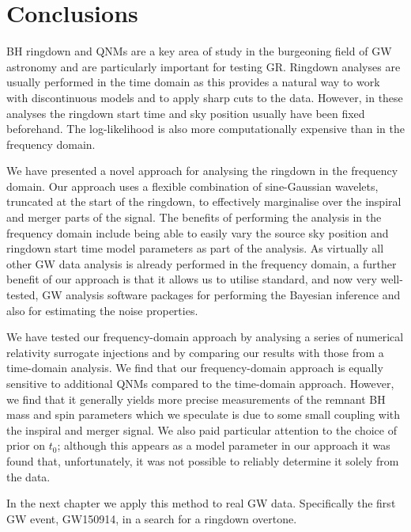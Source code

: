 \section{Conclusions}\label{ch3:sec:discussion}

BH ringdown and QNMs are a key area of study in the burgeoning field of GW astronomy and are particularly important for testing GR.
Ringdown analyses are usually performed in the time domain as this provides a natural way to work with discontinuous models and to apply sharp cuts to the data. 
However, in these analyses the ringdown start time and sky position usually have been fixed beforehand.
The log-likelihood is also more computationally expensive than in the frequency domain.

We have presented a novel approach for analysing the ringdown in the frequency domain. 
Our approach uses a flexible combination of sine-Gaussian wavelets, truncated at the start of the ringdown, to effectively marginalise over the inspiral and merger parts of the signal. 
The benefits of performing the analysis in the frequency domain include being able to easily vary the source sky position and ringdown start time model parameters as part of the analysis.
As virtually all other GW data analysis is already performed in the frequency domain, a further benefit of our approach is that it allows us to utilise standard, and now very well-tested, GW analysis software packages for performing the Bayesian inference and also for estimating the noise properties.

We have tested our frequency-domain approach by analysing a series of numerical relativity surrogate injections and by comparing our results with those from a time-domain analysis. 
We find that our frequency-domain approach is equally sensitive to additional QNMs compared to the time-domain approach.
However, we find that it generally yields more precise measurements of the remnant BH mass and spin parameters which we speculate is due to some small coupling with the inspiral and merger signal.
We also paid particular attention to the choice of prior on $t_0$; although this appears as a model parameter in our approach it was found that, unfortunately, it was not possible to reliably determine it solely from the data.


In the next chapter we apply this method to real GW data.
Specifically the first GW event, GW150914, in a search for a ringdown overtone.